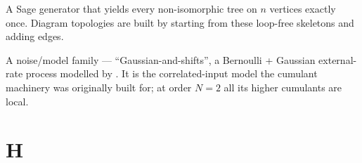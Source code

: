 \begin{description}[leftmargin=0pt,style=nextline]
  \item[\code{graphs.trees(n)}] A Sage generator that yields every non-isomorphic
        tree on $n$ vertices exactly once. Diagram topologies are built by starting
        from these loop-free skeletons and adding edges.

  \item[GTaS] A noise/model family --- ``Gaussian-and-shifts'', a Bernoulli +
        Gaussian external-rate process modelled by . It is the
        correlated-input model the cumulant machinery was originally built for; at
        order $N=2$ all its higher cumulants are local.

\end{description}

\section*{H}
